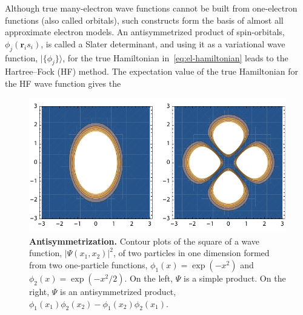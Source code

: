 Although true many-electron wave functions cannot be built from one-electron functions (also called orbitals), such constructs form the basis of almost all approximate electron models.
An antisymmetrized product of spin-orbitals, $\phi_j(\mathbf r_i s_i)$, is called a Slater determinant, and using it as a variational wave function, $|\{\phi_j\}\rangle$, for the true Hamiltonian in~\eqref{eq:el-hamiltonian} leads to the Hartree--Fock (HF) method.
The expectation value of the true Hamiltonian for the HF wave function gives the 





\begin{figure}
\includegraphics[center]{media/exchange}
\caption{\textbf{Antisymmetrization.}
Contour plots of the square of a wave function, $|\Psi(x_1,x_2)|^2$, of two particles in one dimension formed from two one-particle functions, $\phi_1(x)=\exp(-x^2)$ and $\phi_2(x)=\exp(-x^2/2)$.
On the left, $\Psi$ is a simple product.
On the right, $\Psi$ is an antisymmetrized product, $\phi_1(x_1)\phi_2(x_2)-\phi_1(x_2)\phi_2(x_1)$.
}\label{fig:exchange}
\end{figure}

